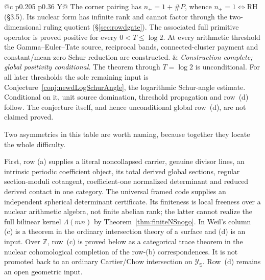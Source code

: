 \documentclass[11pt]{amsart}
\theoremstyle{definition}
\theoremstyle{remark}
\newcommand{\Z}{\mathbb Z}
\newcommand{\RH}{\mathrm{RH}}
\begin{document}
\begin{tabularx}{\textwidth}{@{}c p{} p{} Y@{}}
The corner pairing has $n_+=1+\#P$, whence $n_+=1\iff\RH$ (\S3.5).
Its nuclear form has infinite rank and cannot factor through the
two-dimensional ruling quotient
(\S\ref{sec:rowdgate}).  The associated full primitive operator is proved
positive for every $0<T\le\log2$.  At every arithmetic threshold the
Gamma--Euler--Tate source, reciprocal bands, connected-cluster payment and
constant/mean-zero Schur reduction are constructed. &
\emph{Construction complete; global positivity conditional.}  The theorem
through $T=\log2$ is unconditional.  For all later thresholds the sole
remaining input is Conjecture~\ref{conj:newdLogSchurAngle}, the logarithmic
Schur-angle estimate.  Conditional on it, unit source domination, threshold
propagation and row~(d) follow.  The conjecture itself, and hence
unconditional global row~(d), are not claimed proved.
 \\
\bottomrule
\end{tabularx}
\endgroup

\medskip

Two asymmetries in this table are worth naming, because together they
locate the whole difficulty.

First, row (a) supplies a literal noncollapsed carrier, genuine divisor
lines, an intrinsic periodic coefficient object, its total derived global
sections, regular section-moduli cotangent, coefficient-one normalized
determinant and reduced derived contact in one category.  The universal
framed code supplies an independent spherical determinant certificate.
Its finiteness is local
freeness over a nuclear arithmetic algebra, not finite abelian rank; the
latter cannot realize the full bilinear kernel $\Lambda(mn)$ by
Theorem~\ref{thm:finiteNSnogo}.  In Weil's column (c) is a theorem in the
ordinary intersection theory of a surface and (d) is an input.  Over $\Z$,
row~(c) is proved below as a categorical trace theorem in the nuclear
cohomological completion of the row-(b) correspondences.  It is not promoted
back to an ordinary Cartier/Chow intersection on $\mathscr Y_{\mathbb S}$.  Row~(d)
remains an open geometric input.
\end{document}
